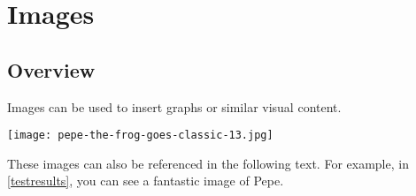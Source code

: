 
\section{Images}

\subsection{Overview}
Images can be used to insert graphs or similar visual content.
\begin{center}
\captionsetup{type=figure}
\texttt{[image: pepe-the-frog-goes-classic-13.jpg]}
\label{testresults}
\end{center}
These images can also be referenced in the following text. For example, in \autoref{testresults}, you can see a fantastic image of Pepe.